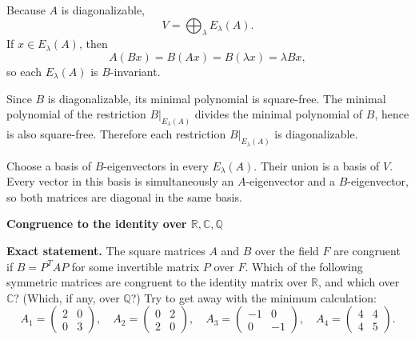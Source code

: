 \begin{solution}
Because \(A\) is diagonalizable,
\[
V=\bigoplus_\lambda E_\lambda(A).
\]
If \(x\in E_\lambda(A)\), then
\[
A(Bx)=B(Ax)=B(\lambda x)=\lambda Bx,
\]
so each \(E_\lambda(A)\) is \(B\)-invariant.

Since \(B\) is diagonalizable, its minimal polynomial is square-free. The minimal polynomial of
the restriction \(B|_{E_\lambda(A)}\) divides the minimal polynomial of \(B\), hence is also
square-free. Therefore each restriction \(B|_{E_\lambda(A)}\) is diagonalizable.

Choose a basis of \(B\)-eigenvectors in every \(E_\lambda(A)\). Their union is a basis of \(V\).
Every vector in this basis is simultaneously an \(A\)-eigenvector and a \(B\)-eigenvector, so
both matrices are diagonal in the same basis.
\end{solution}

\begin{problem}[CP-I-0088]
\label{prob:cp-i-0088}
\textbf{Congruence to the identity over $\mathbb R,\mathbb C,\mathbb Q$}

\textbf{Exact statement.}
\hspace*{1.5em}The square matrices $A$ and $B$ over the field $F$ are congruent if $B=P^{T}AP$ for some invertible matrix $P$ over $F$.
Which of the following symmetric matrices are congruent to the identity matrix over $\mathbb R$, and which over $\mathbb C$?
(Which, if any, over $\mathbb Q$?) Try to get away with the minimum calculation:
\[
A_1=\begin{pmatrix}2&0\\0&3\end{pmatrix},\quad
A_2=\begin{pmatrix}0&2\\2&0\end{pmatrix},\quad
A_3=\begin{pmatrix}-1&0\\0&-1\end{pmatrix},\quad
A_4=\begin{pmatrix}4&4\\4&5\end{pmatrix}.
\]

\end{problem}

